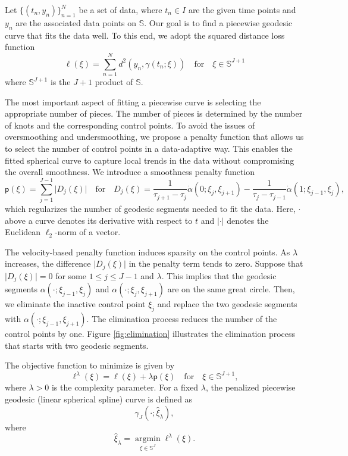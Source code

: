 Let \(\{(t_n, y_n)\}_{n=1}^N\) be a set of data, where \(t_n \in I\) are the given time points and \(y_n\) are the associated data points on \(\mathbb{S}\). Our goal is to find a piecewise geodesic curve that fits the data well. To this end, we adopt the squared distance loss function
\[
\ell(\xi) = \sum_{n = 1}^N d^2(y_n, \gamma(t_n; \xi)) \quad \text{for} \quad \xi \in \mathbb{S}^{J+1}
\]
where \(\mathbb{S}^{J+1}\) is the \(J+1\) product of \(\mathbb{S}\).

The most important aspect of fitting a piecewise curve is selecting the appropriate number of pieces. The number of pieces is determined by the number of knots and the corresponding control points. To avoid the issues of oversmoothing and undersmoothing, we propose a penalty function that allows us to select the number of control points in a data-adaptive way. This enables the fitted spherical curve to capture local trends in the data without compromising the overall smoothness. We introduce a smoothness penalty function
\[
\mathsf{p}(\xi)
=
\sum_{j=1}^{J-1}
\lvert D_j(\xi) \rvert \quad \text{for} \quad D_j(\xi) = \frac{1}{\tau_{j+1} - \tau_j} \dot{\alpha}(0; \xi_j, \xi_{j+1}) - \frac{1}{\tau_j - \tau_{j-1}} \dot{\alpha}(1; \xi_{j-1}, \xi_j),
\]
which regularizes the number of geodesic segments needed to fit the data. Here, \(\cdot\) above a curve denotes its derivative with respect to \(t\) and \(|\cdot|\) denotes the Euclidean \(\ell_2\)-norm of a vector.

The velocity-based penalty function induces sparsity on the control points. As \(\lambda\) increases, the difference \(\lvert D_j(\xi) \rvert\) in the penalty term tends to zero.
Suppose that \(\lvert D_j(\xi) \rvert = 0\) for some \(1 \le j \le J-1\) and \(\lambda\). This implies that the geodesic segments \(\alpha(\cdot; \xi_{j-1}, \xi_j)\) and \(\alpha(\cdot; \xi_j, \xi_{j+1})\) are on the same great circle. Then, we eliminate the inactive control point \(\xi_j\) and replace the two geodesic segments with \(\alpha(\cdot; \xi_{j-1}, \xi_{j+1})\). The elimination process reduces the number of the control points by one. Figure \ref{fig:elimination} illustrates the elimination process that starts with two geodesic segments.

The objective function to minimize is given by
\[
\ell^\lambda(\xi) = \ell(\xi) + \lambda\mathsf{p}(\xi) \quad \text{for} \quad \xi \in \mathbb{S}^{J+1},
\]
where \(\lambda > 0\) is the complexity parameter.
For a fixed \(\lambda\), the penalized piecewise geodesic (linear spherical spline) curve is defined as
\[
\gamma_J(\cdot;\hat{\xi}_\lambda),
\]
where
\[
\hat{\xi}_\lambda = \underset{\xi \in \mathbb{S}^J}{\operatorname{argmin}} \ell^\lambda(\xi).
\]

